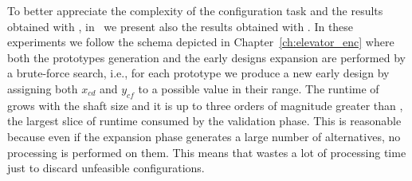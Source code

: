 To better appreciate the complexity of the configuration task and
the results obtained with \liftcreatehr{}, in~\cite{AiLift4} 
we present also the results obtained with \liftcreatebf{}. In these experiments
we follow the schema depicted in Chapter~\ref{ch:elevator_enc} where both the
prototypes generation and the early designs expansion are performed by a
brute-force search, i.e., for each prototype we produce a new early design by
assigning both $x_{cd}$ and $y_{cf}$ to a possible value in their range.
The runtime of \liftcreatebf{} grows with the shaft  size and it is up to 
three orders of magnitude greater than \liftcreatehr, the
largest slice of runtime consumed by the validation phase. This is
reasonable because even if the expansion phase generates a large
number of alternatives, no processing  is performed on them. This
means that \liftcreatebf{} wastes a lot of processing time just to discard
unfeasible configurations.

